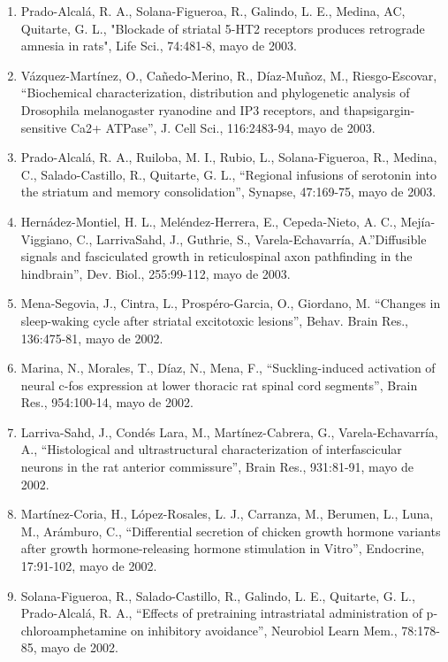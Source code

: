 \begin{enumerate}
\item Prado-Alcalá, R. A., Solana-Figueroa, R., Galindo, L. E., Medina, AC, Quitarte, G. L., "Blockade of striatal 5-HT2 
receptors produces retrograde amnesia in rats", Life Sci., 74:481-8, mayo de 2003.

\item Vázquez-Martínez, O., Cañedo-Merino, R., Díaz-Muñoz, M., Riesgo-Escovar, “Biochemical characterization, distribution 
and phylogenetic analysis of Drosophila melanogaster ryanodine and IP3 receptors, and thapsigargin-sensitive Ca2+ ATPase”, 
J. Cell Sci., 116:2483-94, mayo de 2003.

\item Prado-Alcalá, R. A., Ruiloba, M. I., Rubio, L., Solana-Figueroa, R., Medina, C., Salado-Castillo, R., Quitarte, G. 
L., 
“Regional infusions of serotonin into the striatum and memory consolidation”, Synapse, 47:169-75, mayo de 2003.

\item Hernádez-Montiel, H. L., Meléndez-Herrera, E., Cepeda-Nieto, A. C., Mejía-Viggiano, C., LarrivaSahd, J., Guthrie, S., 
Varela-Echavarría, A.”Diffusible signals and fasciculated growth in reticulospinal axon pathfinding in the hindbrain”, Dev. 
Biol., 255:99-112, mayo de 2003.

\item Mena-Segovia, J., Cintra, L., Prospéro-Garcia, O., Giordano, M. “Changes in sleep-waking cycle after striatal 
excitotoxic lesions”, Behav. Brain Res., 136:475-81, mayo de 2002.

\item Marina, N., Morales, T., Díaz, N., Mena, F., “Suckling-induced activation of neural c-fos expression at lower 
thoracic 
rat spinal cord segments”, Brain Res., 954:100-14, mayo de 2002.

\item Larriva-Sahd, J., Condés Lara, M., Martínez-Cabrera, G., Varela-Echavarría, A., “Histological and ultrastructural 
characterization of interfascicular neurons in the rat anterior commissure”, Brain Res., 931:81-91, mayo de 2002.

\item Martínez-Coria, H., López-Rosales, L. J., Carranza, M., Berumen, L., Luna, M., Arámburo, C., “Differential secretion 
of 
chicken growth hormone variants after growth hormone-releasing hormone stimulation in Vitro”, Endocrine, 17:91-102, mayo de 2002.

\item Solana-Figueroa, R., Salado-Castillo, R., Galindo, L. E., Quitarte, G. L., Prado-Alcalá, R. A., “Effects of 
pretraining 
intrastriatal administration of p-chloroamphetamine on inhibitory avoidance”, Neurobiol Learn Mem., 78:178-85, mayo de 2002.


\end{enumerate}
